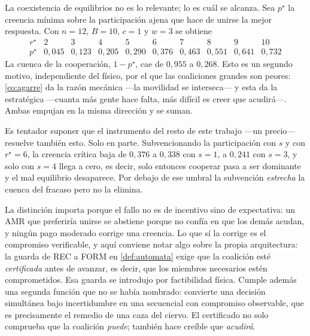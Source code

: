 \begin{observacion}
\label{obs:cuenca-ciervo}
La coexistencia de equilibrios no es lo relevante; lo es cuál se alcanza. Sea
$p^\star$ la creencia mínima sobre la participación ajena que hace de unirse la
mejor respuesta. Con $n=12$, $B=10$, $c=1$ y $w=3$ se obtiene
\[
  \begin{array}{c|ccccccccc}
    r^\star & 2 & 3 & 4 & 5 & 6 & 7 & 8 & 9 & 10\\\hline
    p^\star & 0{,}045 & 0{,}123 & 0{,}205 & 0{,}290 & 0{,}376 & 0{,}463 &
    0{,}551 & 0{,}641 & 0{,}732
  \end{array}
\]
La cuenca de la cooperación, $1-p^\star$, cae de $0{,}955$ a $0{,}268$. Esto es
un segundo motivo, independiente del físico, por el que las coaliciones grandes
son peores: \cref{co:agarre} da la razón mecánica —la movilidad se interseca— y
esta da la estratégica —cuanta más gente hace falta, más difícil es creer que
acudirá—. Ambas empujan en la misma dirección y se suman.
\end{observacion}

\figCiervo

\begin{observacion}
\label{obs:precio-no-basta}
Es tentador suponer que el instrumento del resto de este trabajo —un precio—
resuelve también esto. Solo en parte. Subvencionando la participación con $s$ y
con $r^\star=6$, la creencia crítica baja de $0{,}376$ a $0{,}338$ con $s=1$, a
$0{,}241$ con $s=3$, y solo con $s=4$ llega a cero, es decir, solo entonces
cooperar pasa a ser dominante y el mal equilibrio desaparece. Por debajo de ese
umbral la subvención \emph{estrecha} la cuenca del fracaso pero no la elimina.

La distinción importa porque el fallo no es de incentivo sino de expectativa: un
AMR que preferiría unirse se abstiene porque no confía en que los demás acudan, y
ningún pago moderado corrige una creencia. Lo que sí la corrige es el
compromiso verificable, y aquí conviene notar algo sobre la propia arquitectura:
la guarda de \textsf{REC} a \textsf{FORM} en \cref{def:automata} exige que la
coalición esté \emph{certificada} antes de avanzar, es decir, que los miembros
necesarios estén comprometidos. Esa guarda se introdujo por factibilidad física.
Cumple además una segunda función que no se había nombrado: convierte una
decisión simultánea bajo incertidumbre en una secuencial con compromiso
observable, que es precisamente el remedio de una caza del ciervo. El certificado
no solo comprueba que la coalición \emph{puede}; también hace creíble que
\emph{acudirá}.
\end{observacion}

